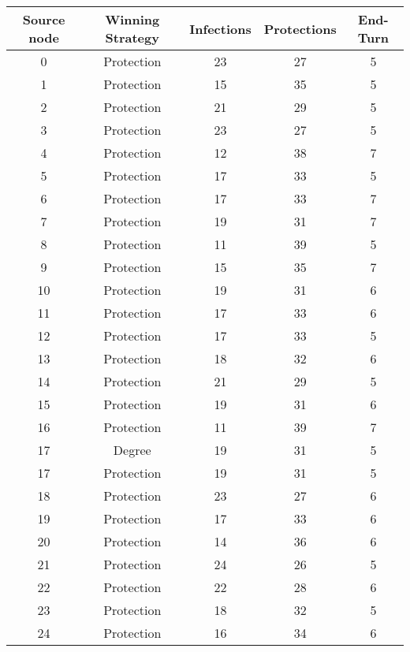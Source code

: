 \documentclass[results.tex]{subfiles}
\begin{document}
\begin{center}
  \begin{tabular}{| c || c | c | c | c |}
    \hline
    {\bfseries Source node} & {\bfseries Winning Strategy} & {\bfseries Infections} & {\bfseries Protections} & {\bfseries End-Turn} \\  %
    \hline\hline
    0 & Protection & 23 & 27 & 5 \\ 
    \hline
    1 & Protection & 15 & 35 & 5 \\ 
    \hline
    2 & Protection & 21 & 29 & 5 \\ 
    \hline
    3 & Protection & 23 & 27 & 5 \\ 
    \hline
    4 & Protection & 12 & 38 & 7 \\ 
    \hline
    5 & Protection & 17 & 33 & 5 \\ 
    \hline
    6 & Protection & 17 & 33 & 7 \\ 
    \hline
    7 & Protection & 19 & 31 & 7 \\ 
    \hline
    8 & Protection & 11 & 39 & 5 \\ 
    \hline
    9 & Protection & 15 & 35 & 7 \\ 
    \hline
    10 & Protection & 19 & 31 & 6 \\ 
    \hline
    11 & Protection & 17 & 33 & 6 \\ 
    \hline
    12 & Protection & 17 & 33 & 5 \\ 
    \hline
    13 & Protection & 18 & 32 & 6 \\ 
    \hline
    14 & Protection & 21 & 29 & 5 \\ 
    \hline
    15 & Protection & 19 & 31 & 6 \\ 
    \hline
    16 & Protection & 11 & 39 & 7 \\ 
    \hline
    17 & Degree & 19 & 31 & 5 \\ 
    \hline
    17 & Protection & 19 & 31 & 5 \\ 
    \hline
    18 & Protection & 23 & 27 & 6 \\ 
    \hline
    19 & Protection & 17 & 33 & 6 \\ 
    \hline
    20 & Protection & 14 & 36 & 6 \\ 
    \hline
    21 & Protection & 24 & 26 & 5 \\ 
    \hline
    22 & Protection & 22 & 28 & 6 \\ 
    \hline
    23 & Protection & 18 & 32 & 5 \\ 
    \hline
    24 & Protection & 16 & 34 & 6 \\ 

\end{tabular}
\end{center}
\end{document}
